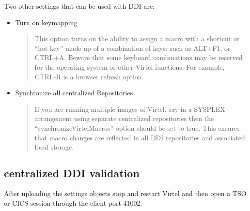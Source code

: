 \documentclass[letterpaper,10pt,english]{sphinxmanual}
\begin{document}
Two other settings that can be used with DDI are: -
\begin{itemize}
\item {} 
                        Turn on keymapping
\begin{quote}

This option turns on the ability to assign a macro with a shortcut or “hot key” made up of a combination of keys; such as ALT+F1, or CTRL+A.  Beware that some keyboard combinations may be reserved for the operating system or other Virtel functions. For example, CTRL-R is a browser refresh option.
\end{quote}

\item {} 
           Synchronize all centralized Repositories
\begin{quote}

If you are running multiple images of Virtel, say in a SYSPLEX arrangement using separate centralized repositories then the “synchronizeVirtelMacros” option should be set to true. This ensures that macro changes are reflected in all DDI repositories and associated local storage.
\end{quote}

\end{itemize}

\ignorespaces 

\subsection{centralized DDI validation}
\label{\detokenize{Customization:centralized-ddi-validation}}\label{\detokenize{Customization:index-84}}
After uploading the settings objects stop and restart Virtel and then open a TSO or CICS session through the client port 41002.

\begin{sphinxVerbatim}[commandchars=\\\{\}]
\end{sphinxVerbatim}
\end{document}
